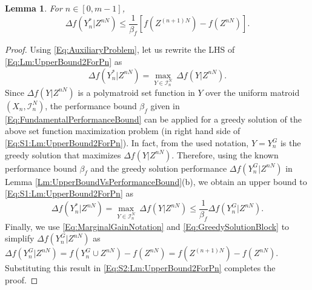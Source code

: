 \documentclass[letterpaper, 10 pt, conference]{ieeeconf}
\newtheorem{lemma}{Lemma}
\begin{document}
{%

\begin{lemma} \label{Lm:UpperBound2ForPn}
For $n\in [0,m-1]$,
\begin{equation} \label{Eq:Lm:UpperBound2ForPn}
\Delta f(Y^*_n\vert Z^{nN}) \leq  \frac{1}{\beta_f}\left[ f(Z^{(n+1)N})-f(Z^{nN})\right].      
\end{equation}
\end{lemma}

\begin{proof}
Using \eqref{Eq:AuxiliaryProblem}, let us rewrite the LHS of \eqref{Eq:Lm:UpperBound2ForPn} as
\begin{equation}\label{Eq:S1:Lm:UpperBound2ForPn}
    \Delta f(Y^*_n\vert Z^{nN}) = \underset{Y\in\mathcal{I}^N_n}{\max}\ \Delta f(Y\vert Z^{nN}).
\end{equation}
Since $\Delta f(Y\vert Z^{nN})$ is a polymatroid set function in $Y$ over the uniform matroid $(X_n,\mathcal{I}^N_n)$, the performance bound $\beta_f$ given in \eqref{Eq:FundamentalPerformanceBound} can be applied for a greedy solution of the above set function maximization problem (in right hand side of \eqref{Eq:S1:Lm:UpperBound2ForPn}). In fact, from the used notation, $Y=Y^G_n$ is the greedy solution that maximizes $\Delta f(Y\vert Z^{nN})$. Therefore, using the known performance bound $\beta_f$ and the greedy solution performance $\Delta f(Y^G_n\vert Z^{nN})$ in Lemma \ref{Lm:UpperBoundVsPerformanceBound}(b), we obtain an upper bound to \eqref{Eq:S1:Lm:UpperBound2ForPn} as 
\begin{equation}\label{Eq:S2:Lm:UpperBound2ForPn}
    \Delta f(Y^*_n\vert Z^{nN}) = \underset{Y\in\mathcal{I}^N_n}{\max}\ \Delta f(Y\vert Z^{nN}) \leq \frac{1}{\beta_f} \Delta f(Y^G_n\vert Z^{nN}).
\end{equation}
Finally, we use \eqref{Eq:MarginalGainNotation} and \eqref{Eq:GreedySolutionBlock} to simplify $\Delta f(Y^G_n\vert Z^{nN})$ as $\Delta f(Y^G_n\vert Z^{nN}) = f(Y^G_n\cup Z^{nN})-f(Z^{nN}) = f(Z^{(n+1)N})-f(Z^{nN})$. Substituting this result in \eqref{Eq:S2:Lm:UpperBound2ForPn} completes the proof. 
\end{proof}





}
\end{document}
